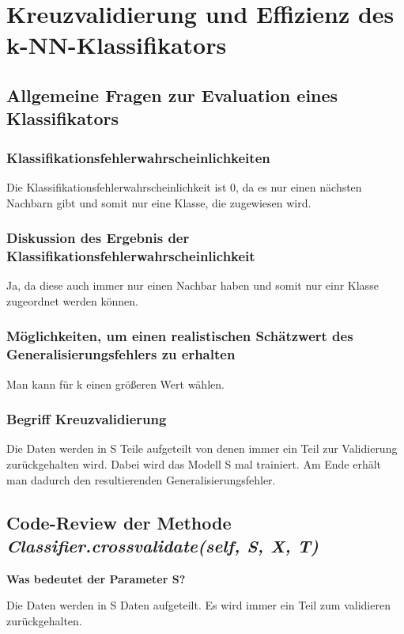 \section{Kreuzvalidierung und Effizienz des k-NN-Klassifikators}

\subsection{Allgemeine Fragen zur Evaluation eines Klassifikators}

\subsubsection{Klassifikationsfehlerwahrscheinlichkeiten}
Die Klassifikationsfehlerwahrscheinlichkeit ist 0, da es nur einen nächsten Nachbarn gibt und somit nur eine Klasse, die zugewiesen wird. 


\subsubsection{Diskussion des Ergebnis der Klassifikationsfehlerwahrscheinlichkeit}
Ja, da diese auch immer nur einen Nachbar haben und somit nur einr Klasse zugeordnet werden können.

\subsubsection{Möglichkeiten, um einen realistischen Schätzwert des Generalisierungsfehlers zu erhalten}
Man kann für k einen größeren Wert wählen. 
\subsubsection{Begriff Kreuzvalidierung}
Die Daten werden in S Teile aufgeteilt von denen immer ein Teil zur Validierung zurückgehalten wird. Dabei wird das Modell S mal trainiert. Am Ende erhält man dadurch den resultierenden Generalisierungsfehler.

\subsection{Code-Review der Methode \textit{Classifier.crossvalidate(self, S, X, T)}}

\noindent
\textbf{Was bedeutet der Parameter S?}

\vspace{5px}
\noindent
Die Daten werden in S Daten aufgeteilt. Es wird immer ein Teil zum validieren zurückgehalten. 

